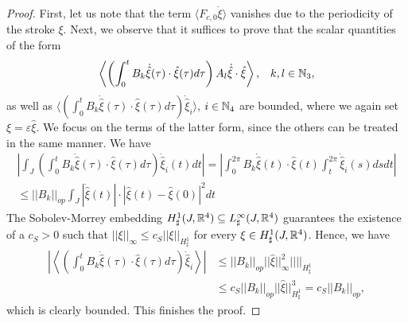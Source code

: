 \begin{proof}
First, let us note that the term $\langle F_{c,0} \dot{\xi} \rangle$ vanishes due to the periodicity of the stroke $\xi$. Next, we observe that it suffices to prove that the scalar quantities of the form 
\begin{align}
\left \langle \left ( \int_{0}^{t} B_k \dot{\hat{\xi}}(\tau)  \cdot \hat{\xi}(\tau) d\tau \right ) A_l \dot{\hat{\xi}} \cdot \hat{\xi} \right  \rangle, & & k,l \in \mathbb{N}_3,
\end{align}
as well as $ \langle  ( \int_{0}^{t} B_k \dot{\hat{\xi}}(\tau)  \cdot \hat{\xi}(\tau) d \tau  )\dot{\hat{\xi}}_i  \rangle$, $i \in \mathbb{N}_4$ are bounded, where we again set $\xi = \varepsilon \hat{\xi}$. We focus on the terms of the latter form, since the others can be treated in the same manner. We have
\begin{equation}
\begin{aligned}
\left |\int_J \left ( \int_{0}^{t} B_k \dot{\hat{\xi}}(\tau) \cdot \hat{\xi}(\tau) d\tau\right ) \dot{\hat{\xi}}_i(t) dt \right | = \left | \int_{0}^{2\pi} B_k \dot{\hat{\xi}}(t) \cdot \hat{\xi}(t) \int_{t}^{2 \pi} \dot{\hat{\xi}}_i(s) ds dt \right |\\
\leq ||B_k||_{op} \int_{J} |\dot{\hat{\xi}}(t)| \cdot |\hat{\xi}(t) - \hat{\xi}(0)|^2 dt
\end{aligned}
\end{equation}
The Sobolev-Morrey embedding $H_\sharp^{1}(J, \mathbb{R}^4) \subseteq L^\infty_{\sharp}(J, \mathbb{R}^4)$ guarantees the existence of a $c_S > 0$ such that $||\xi||_{\infty} \leq c_S ||\xi||_{H_\sharp^1}$ for every $\xi \in H_\sharp^1(J, \mathbb{R}^4)$. Hence, we have
\begin{equation}
\begin{aligned}
\left | \left \langle \left  ( \int_{0}^{t} B_k \dot{\hat{\xi}}(\tau)  \cdot \hat{\xi}(\tau) d \tau  \right )\dot{\hat{\xi}}_i \right  \rangle\right |
& \leq ||B_k||_{op} ||\hat{\xi}||_{\infty}^2 ||||_{H_\sharp^1}\\
&\leq c_S ||B_k||_{op} ||\hat{\xi}||_{H_\sharp^1}^3 = c_S ||B_k||_{op},
\end{aligned}
\end{equation}
which is clearly bounded. This finishes the proof.
\end{proof}

